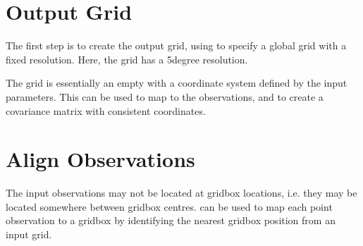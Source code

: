 \documentclass[letterpaper,10pt,english]{sphinxmanual}
\begin{document}
\begin{sphinxVerbatim}[commandchars=\\\{\}]
   
\end{sphinxVerbatim}


\section{Output Grid}
\label{\detokenize{workflow:output-grid}}
\sphinxAtStartPar
The first step is to create the output grid, using
{\hyperref[\detokenize{covariance:glomar_gridding.grid.grid_from_resolution}]{}} to specify a global grid with a fixed
resolution. Here, the grid has a 5\sphinxhyphen{}degree resolution.

\sphinxAtStartPar
The grid is essentially an empty  with a coordinate system defined by the input
parameters. This can be used to map to the observations, and to create a covariance matrix with
consistent coordinates.

\begin{sphinxVerbatim}[commandchars=\\\{\}]
  
    \PYG{p}{[}   \PYG{p}{]}
    \PYG{p}{[} \PYG{p}{]}
\end{sphinxVerbatim}


\section{Align Observations}
\label{\detokenize{workflow:align-observations}}
\sphinxAtStartPar
The input observations may not be located at grid\sphinxhyphen{}box locations, i.e. they may be located somewhere
between grid\sphinxhyphen{}box centres. {\hyperref[\detokenize{kriging:glomar_gridding.grid.map_to_grid}]{}} can be used to map each point
observation to a grid\sphinxhyphen{}box by identifying the nearest grid\sphinxhyphen{}box position from an input grid.
\end{document}
